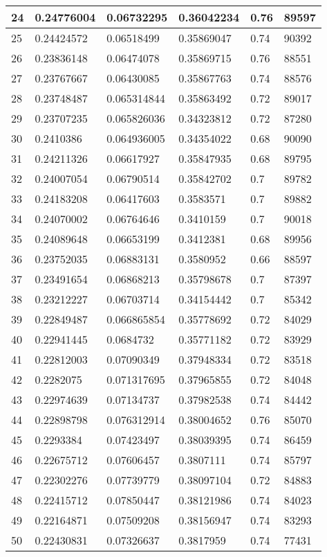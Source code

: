 \begin{longtable}{|l|l|l|l|l|l|}
24 & 0.24776004 & 0.06732295 & 0.36042234 & 0.76 & 89597 \\ \hline 
25 & 0.24424572 & 0.06518499 & 0.35869047 & 0.74 & 90392 \\ \hline 
26 & 0.23836148 & 0.06474078 & 0.35869715 & 0.76 & 88551 \\ \hline 
27 & 0.23767667 & 0.06430085 & 0.35867763 & 0.74 & 88576 \\ \hline 
28 & 0.23748487 & 0.065314844 & 0.35863492 & 0.72 & 89017 \\ \hline 
29 & 0.23707235 & 0.065826036 & 0.34323812 & 0.72 & 87280 \\ \hline 
30 & 0.2410386 & 0.064936005 & 0.34354022 & 0.68 & 90090 \\ \hline 
31 & 0.24211326 & 0.06617927 & 0.35847935 & 0.68 & 89795 \\ \hline 
32 & 0.24007054 & 0.06790514 & 0.35842702 & 0.7 & 89782 \\ \hline 
33 & 0.24183208 & 0.06417603 & 0.3583571 & 0.7 & 89882 \\ \hline 
34 & 0.24070002 & 0.06764646 & 0.3410159 & 0.7 & 90018 \\ \hline 
35 & 0.24089648 & 0.06653199 & 0.3412381 & 0.68 & 89956 \\ \hline 
36 & 0.23752035 & 0.06883131 & 0.3580952 & 0.66 & 88597 \\ \hline 
37 & 0.23491654 & 0.06868213 & 0.35798678 & 0.7 & 87397 \\ \hline 
38 & 0.23212227 & 0.06703714 & 0.34154442 & 0.7 & 85342 \\ \hline 
39 & 0.22849487 & 0.066865854 & 0.35778692 & 0.72 & 84029 \\ \hline 
40 & 0.22941445 & 0.0684732 & 0.35771182 & 0.72 & 83929 \\ \hline 
41 & 0.22812003 & 0.07090349 & 0.37948334 & 0.72 & 83518 \\ \hline 
42 & 0.2282075 & 0.071317695 & 0.37965855 & 0.72 & 84048 \\ \hline 
43 & 0.22974639 & 0.07134737 & 0.37982538 & 0.74 & 84442 \\ \hline 
44 & 0.22898798 & 0.076312914 & 0.38004652 & 0.76 & 85070 \\ \hline 
45 & 0.2293384 & 0.07423497 & 0.38039395 & 0.74 & 86459 \\ \hline 
46 & 0.22675712 & 0.07606457 & 0.3807111 & 0.74 & 85797 \\ \hline 
47 & 0.22302276 & 0.07739779 & 0.38097104 & 0.72 & 84883 \\ \hline 
48 & 0.22415712 & 0.07850447 & 0.38121986 & 0.74 & 84023 \\ \hline 
49 & 0.22164871 & 0.07509208 & 0.38156947 & 0.74 & 83293 \\ \hline 
50 & 0.22430831 & 0.07326637 & 0.3817959 & 0.74 & 77431 \\ \hline 
\end{longtable}
